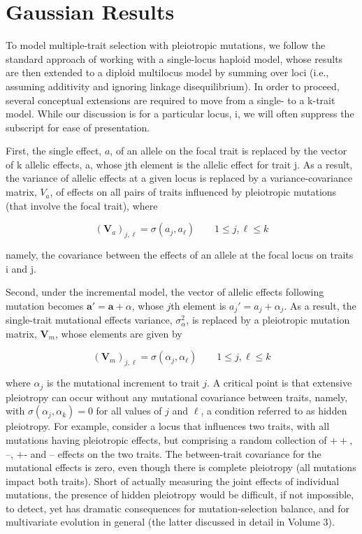 \documentclass{article}
\begin{document}
\section{Gaussian Results}
To model multiple-trait selection with pleiotropic mutations, we follow the standard approach of working with a single-locus haploid model, whose results are then extended to a diploid multilocus model by summing over loci (i.e., assuming additivity and ignoring linkage disequilibrium). In order to proceed, several conceptual extensions are required to move from a single- to a k-trait model. While our discussion is for a particular locus, i, we will often suppress the subscript for ease of presentation.

First, the single effect,  $ a $, of an allele on the focal trait is replaced by the vector of k allelic effects, a, whose jth element is the allelic effect for trait j. As a result, the variance of allelic effects at a given locus is replaced by a variance-covariance matrix,  $ V_a $, of effects on all pairs of traits influenced by pleiotropic mutations (that involve the focal trait), where

\begin{equation}
\left(\mathbf{V}_{a}\right)_{j,\ell}=\sigma\left(a_{j},a_{\ell}\right)\qquad1\leq j,\ell\leq k
\tag{28.35a}
\label{eq:28_35a}
\end{equation}

namely, the covariance between the effects of an allele at the focal locus on traits i and j.

Second, under the incremental model, the vector of allelic effects following mutation becomes  $ \mathbf{a}' = \mathbf{a} + \alpha $, whose  $ j $th element is  $ a_j' = a_j + \alpha_j $. As a result, the single-trait mutational effects variance,  $ \sigma_\alpha^2 $, is replaced by a pleiotropic mutation matrix,  $ \mathbf{V}_m $, whose elements are given by

\begin{equation}
\left(\mathbf{V}_{m}\right)_{j,\ell}=\sigma\left(\alpha_{j},\alpha_{\ell}\right)\qquad1\leq j,\ell\leq k
\tag{28.35b}
\label{eq:28_35b}
\end{equation}

where  $ \alpha_j $ is the mutational increment to trait  $ j $. A critical point is that extensive pleiotropy can occur without any mutational covariance between traits, namely, with  $ \sigma(\alpha_j, \alpha_k) = 0 $ for all values of  $ j $ and  $ \ell $, a condition referred to as hidden pleiotropy. For example, consider a locus that influences two traits, with all mutations having pleiotropic effects, but comprising a random collection of  $ ++ $,  $ \text{--} $,  $ \text{+-} $ and  $ \text{--} $ effects on the two traits. The between-trait covariance for the mutational effects is zero, even though there is complete pleiotropy (all mutations impact both traits). Short of actually measuring the joint effects of individual mutations, the presence of hidden pleiotropy would be difficult, if not impossible, to detect, yet has dramatic consequences for mutation-selection balance, and for multivariate evolution in general (the latter discussed in detail in Volume 3).
\end{document}
